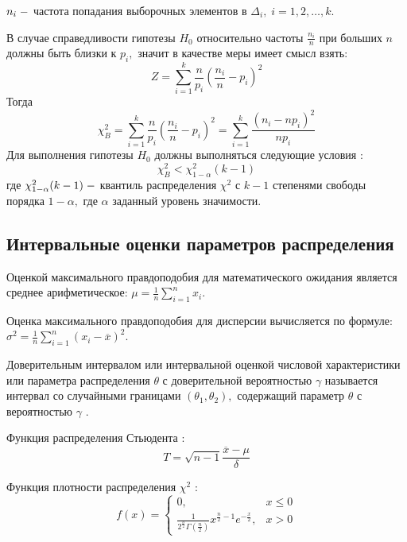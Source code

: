 \documentclass[a4]{article}
\begin{document}
$n_i\;\--$ частота попадания выборочных элементов в $\Delta_i,\;i=1,2,\ldots,k.$

В случае справедливости гипотезы $H_0$ относительно частоты $\frac{n_i}{n}$ при больших $n$ должны быть близки к $p_i,$ значит в качестве меры имеет смысл взять: 
\begin{equation}
    Z = \sum\limits_{i=1}^k\frac{n}{p_i}\left(\frac{n_i}{n}-p_i\right)^2
\end{equation}
Тогда
\begin{equation}
    \chi^2_B=\sum\limits_{i=1}^k\frac{n}{p_i}\left(\frac{n_i}{n}-p_i\right)^2=\sum\limits_{i=1}^k\frac{(n_i-np_i)^2}{np_i}
\end{equation}
Для выполнения гипотезы $H_0$ должны выполняться следующие условия \cite{7_2}:
\begin{equation}
    \chi_B^2 < \chi_{1-\alpha}^2(k-1)
\end{equation}
где $\chi_{1-\alpha}^2(k-1)\;\--$ квантиль распределения $\chi^2$ с $k-1$ степенями свободы порядка $1-\alpha,$ где $\alpha$ заданный уровень значимости.

\subsection{Интервальные оценки параметров распределения}

Оценкой максимального правдоподобия для математического ожидания  является среднее арифметическое: $\mu=\frac{1}{n}\sum\limits_{i=1}^nx_i.$

Оценка максимального правдоподобия для дисперсии вычисляется по формуле: $\sigma^2 = \frac{1}{n}\sum\limits_{i=1}^n(x_i-\overline{x})^2.$

Доверительным интервалом или интервальной оценкой числовой характеристики или параметра распределения $\theta$ с доверительной вероятностью $\gamma$ называется интервал со случайными границами $(\theta_1,\theta_2),$ содержащий параметр $\theta$ с вероятностью $\gamma$ \cite{8_1}.

Функция распределения Стьюдента \cite{8_2}:
\begin{equation}
    T = \sqrt{n-1}\frac{\overline{x}-\mu}{\delta}
\end{equation}

Функция плотности распределения $\chi^2$ \cite{8_3}:
\begin{equation}
    f(x) = \begin{cases}
    0,&x\leq 0\\
    \frac{1}{2^\frac{n}{2}\Gamma\left(\frac{n}{2}\right)}x^{\frac{n}{2}-1}e^{-\frac{x}{2}},& x>0
    \end{cases}
\end{equation}
\end{document}
